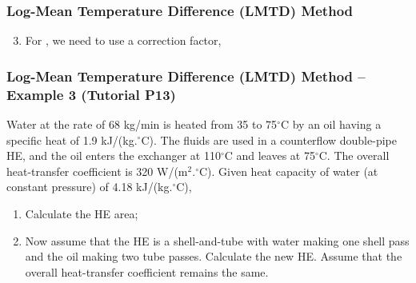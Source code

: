 \documentclass[10pt,compress,handout,ignorenonframetext,unknownkeysallowed]{beamer}
\begin{document}
\begin{frame}
  \frametitle{Log-Mean Temperature Difference (LMTD) Method}
     \begin{enumerate}\setcounter{enumi}{2}
          \item<1-> For , we need to use a correction factor, 
     \end{enumerate}

\end{frame}

\begin{frame}
  \frametitle{Log-Mean Temperature Difference (LMTD) Method -- Example 3 (Tutorial P13)}
Water at the rate of 68 kg/min is heated from 35 to 75$^{\circ}$C by an oil having a specific heat of 1.9 kJ/(kg.$^{\circ}$C). The fluids are used in a counterflow double-pipe HE, and the oil enters the exchanger at 110$^{\circ}$C and leaves at 75$^{\circ}$C. The overall heat-transfer coefficient is 320 W/(m$^{2}.^{\circ}$C). Given heat capacity of water (at constant pressure) of 4.18 kJ/(kg.$^{\circ}$C),
\begin{enumerate}
   \item Calculate the HE area;
   \item Now assume that the HE is a shell-and-tube with water making one shell pass and the oil making two tube passes. Calculate the new HE. Assume that the overall heat-transfer coefficient remains the same. 
\end{enumerate}
\end{frame}
\end{document}
